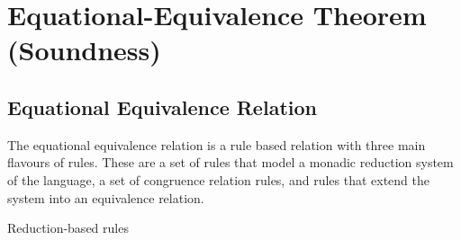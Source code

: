 \documentclass{report}
\begin{document}
\chapter{Equational-Equivalence Theorem (Soundness)}

\section{Equational Equivalence Relation}

The equational equivalence relation is a rule based relation with three main flavours of rules. These are a set of rules that model a monadic reduction system of the language, a set of congruence relation rules, and rules that extend the system into an equivalence relation.


Reduction-based rules
\end{document}
